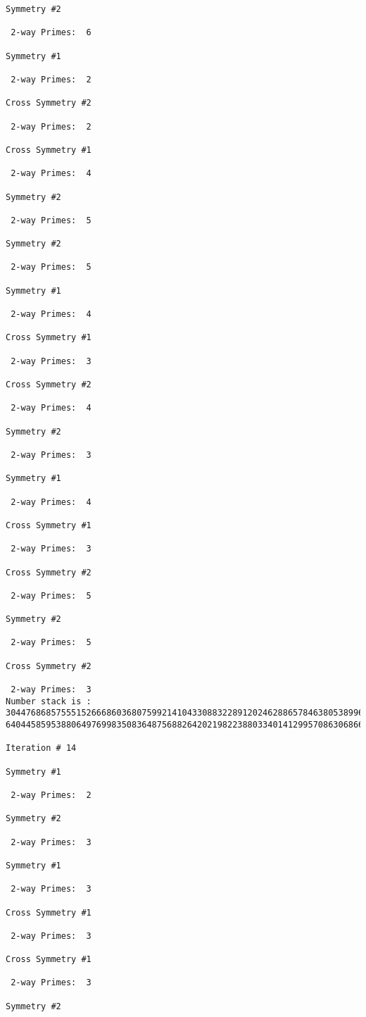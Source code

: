 {{{{\begin{verbatim}
Symmetry #2

 2-way Primes: 	6

Symmetry #1

 2-way Primes: 	2

Cross Symmetry #2

 2-way Primes: 	2

Cross Symmetry #1

 2-way Primes: 	4

Symmetry #2

 2-way Primes: 	5

Symmetry #2

 2-way Primes: 	5

Symmetry #1

 2-way Primes: 	4

Cross Symmetry #1

 2-way Primes: 	3

Cross Symmetry #2

 2-way Primes: 	4

Symmetry #2

 2-way Primes: 	3

Symmetry #1

 2-way Primes: 	4

Cross Symmetry #1

 2-way Primes: 	3

Cross Symmetry #2

 2-way Primes: 	5

Symmetry #2

 2-way Primes: 	5

Cross Symmetry #2

 2-way Primes: 	3
Number stack is :
30447686857555152666860368075992141043308832289120246288657846380538996794608835958544046240163340857
64044585953880649769983508364875688264202198223880334014129957086306866625155575868674403758043361042

Iteration #	14

Symmetry #1

 2-way Primes: 	2

Symmetry #2

 2-way Primes: 	3

Symmetry #1

 2-way Primes: 	3

Cross Symmetry #1

 2-way Primes: 	3

Cross Symmetry #1

 2-way Primes: 	3

Symmetry #2


\end{verbatim}}}}}
